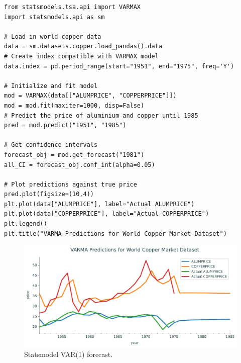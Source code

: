\begin{lstlisting}
from statsmodels.tsa.api import VARMAX
import statsmodels.api as sm

# Load in world copper data
data = sm.datasets.copper.load_pandas().data
# Create index compatible with VARMAX model
data.index = pd.period_range(start="1951", end="1975", freq='Y')

# Initialize and fit model
mod = VARMAX(data[["ALUMPRICE", "COPPERPRICE"]])
mod = mod.fit(maxiter=1000, disp=False)
# Predict the price of aluminium and copper until 1985
pred = mod.predict("1951", "1985")

# Get confidence intervals
forecast_obj = mod.get_forecast("1981")
all_CI = forecast_obj.conf_int(alpha=0.05)

# Plot predictions against true price
pred.plot(figsize=(10,4))
plt.plot(data["ALUMPRICE"], label="Actual ALUMPRICE")
plt.plot(data["COPPERPRICE"], label="Actual COPPERPRICE")
plt.legend()
plt.title("VARMA Predictions for World Copper Market Dataset")
\end{lstlisting}

\begin{figure}[H]
\centering
\includegraphics[width=\textwidth]{figures/copper.pdf}
\caption{Statsmodel VAR(1) forecast.}
\label{fig:varma}
\end{figure}

